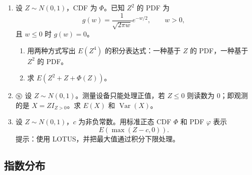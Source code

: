 \documentclass[UTF8,12pt,a4paper,fontset=fandol]{ctexart}
\begin{document}
\begin{enumerate}
  \item 设 $Z\sim N(0,1)$，CDF 为 $\Phi$。已知 $Z^2$ 的 PDF 为
  \[
    g(w)=\frac{1}{\sqrt{2\pi w}}e^{-w/2},\qquad w>0,
  \]
  且 $w\le0$ 时 $g(w)=0$。
  \begin{enumerate}
    \item 用两种方式写出 $E(Z^4)$ 的积分表达式：一种基于 $Z$ 的 PDF，一种基于 $Z^2$ 的 PDF。
    \item 求 $E(Z^2+Z+\Phi(Z))$。
  \end{enumerate}

  \item $\circledS$ 设 $Z\sim N(0,1)$。测量设备只能处理正值，若 $Z\le0$ 则读数为 $0$；即观测的是 $X=ZI_{Z>0}$。求 $E(X)$ 和 $\operatorname{Var}(X)$。

  \item 设 $Z\sim N(0,1)$，$c$ 为非负常数。用标准正态 CDF $\Phi$ 和 PDF $\varphi$ 表示
  \[
    E(\max(Z-c,0)).
  \]
  提示：使用 LOTUS，并把最大值通过积分下限处理。
\end{enumerate}

\subsection*{指数分布}
\end{document}
